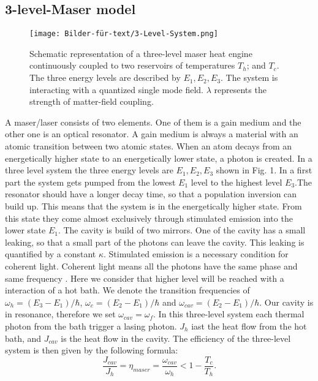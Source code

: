 \documentclass[12pt,a4paper]{article}
\begin{document}
\subsection{3-level-Maser model}
\begin{figure}[h!] 
\texttt{[image: Bilder-für-text/3-Level-System.png]}
\caption{Schematic representation of a three-level maser heat engine
continuously coupled to two reservoirs of temperatures $T_h$;  and
$T_c$. The three energy levels are described by $E_1,E_2,E_3$. The
system is interacting with a quantized single mode field. $\lambda$
represents the strength of matter-field coupling.}
\end{figure}
A maser/laser consists of two elements. One of them is a gain medium and the other one is an optical resonator. A gain medium is always a material with an atomic transition between two atomic states. When an atom decays from an energetically higher state to an energetically lower state, a photon is created.
In a three level system the three energy levels are $E_1,E_2,E_3$ shown in Fig. 1. In a first part the system gets pumped from the lowest $E_1$ level to the highest level $ E_3$.The resonator should have a longer decay time, so that a population inversion can build up. This means that the system is in the energetically higher state. From this state they come almost exclusively through stimulated emission into the lower state $ E_1$.  The cavity is build of two mirrors. One of the cavity has a small leaking, so that a small part of the photons can leave the cavity. This leaking is quantified by a constant $\kappa$. 
Stimulated emission is a necessary condition for coherent light. Coherent light means all the photons have the same phase and same frequency \cite{Li2017}.
Here we consider that higher level will be reached with a interaction of a hot bath.  
We denote the transition frequencies of $\omega_h=(E_3-E_1)/\hbar$, $\omega_c=(E_2-E_1)/\hbar$ and $\omega_{cav}=(E_2-E_1)/\hbar$.
Our cavity is in  resonance, therefore we set $\omega_{cav}=\omega_f$. 
In this three-level system each thermal photon from the bath trigger a lasing photon. 
$J_h$ iast the heat flow from the hot bath, and $J_{cav}$ is the heat flow in the cavity.
The efficiency of the three-level system is then given by the following formula:
\begin{equation}
\frac{J_{cav}}{J_h}=\eta_{maser}=\frac{\omega_{cav}}{\omega_h}<1-\frac{T_c}{T_h}.
\end{equation}
\end{document}
